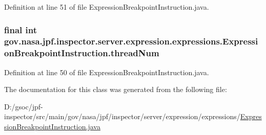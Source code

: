 Definition at line 51 of file Expression\+Breakpoint\+Instruction.\+java.

\subsubsection[{\texorpdfstring{thread\+Num}{threadNum}}]{\setlength{\rightskip}{0pt plus 5cm}final int gov.\+nasa.\+jpf.\+inspector.\+server.\+expression.\+expressions.\+Expression\+Breakpoint\+Instruction.\+thread\+Num\hspace{0.3cm}{\ttfamily [private]}}\hypertarget{classgov_1_1nasa_1_1jpf_1_1inspector_1_1server_1_1expression_1_1expressions_1_1_expression_breakpoint_instruction_ae0489eeae571443863290d903f344df4}{}\label{classgov_1_1nasa_1_1jpf_1_1inspector_1_1server_1_1expression_1_1expressions_1_1_expression_breakpoint_instruction_ae0489eeae571443863290d903f344df4}


Definition at line 50 of file Expression\+Breakpoint\+Instruction.\+java.



The documentation for this class was generated from the following file\+:\begin{DoxyCompactItemize}
\item 
D\+:/gsoc/jpf-\/inspector/src/main/gov/nasa/jpf/inspector/server/expression/expressions/\hyperlink{_expression_breakpoint_instruction_8java}{Expression\+Breakpoint\+Instruction.\+java}\end{DoxyCompactItemize}
